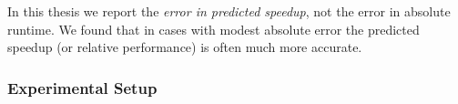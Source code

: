 
In this thesis we report the \emph{error in predicted speedup}, not the error in absolute runtime.
We found that in cases with modest absolute error the predicted speedup (or relative performance) is often much more accurate.


\subsubsection{Experimental Setup}

